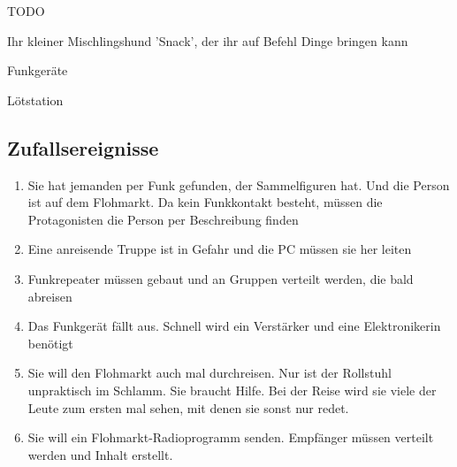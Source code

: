 \begin{npcBox}[title=Antigone]
    \begin{stunts}
    \item {}
    \end{stunts}

    \begin{stressSection}
    \end{stressSection}
    \begin{tabularx}{\textwidth}{ XX }
    \end{tabularx}

    \begin{consequences}
    \item {}
    \item {}
    \item {}
    \end{consequences}

    \begin{npcDescription}
    TODO
    \end{npcDescription}


    \begin{equipment}
    \item Ihr kleiner Mischlingshund 'Snack', der ihr auf Befehl Dinge bringen kann
    \item Funkgeräte
    \item Lötstation
    \end{equipment}
\end{npcBox}

\subsection{Zufallsereignisse}

\begin{enumerate}
\item Sie hat jemanden per Funk gefunden, der Sammelfiguren hat. Und die Person ist auf dem Flohmarkt. Da kein Funkkontakt besteht, müssen die Protagonisten die Person per Beschreibung finden
\item Eine anreisende Truppe ist in Gefahr und die PC müssen sie her leiten
\item Funkrepeater müssen gebaut und an Gruppen verteilt werden, die bald abreisen
\item Das Funkgerät fällt aus. Schnell wird ein Verstärker und eine Elektronikerin benötigt
\item Sie will den Flohmarkt auch mal durchreisen. Nur ist der Rollstuhl unpraktisch im Schlamm. Sie braucht Hilfe. Bei der Reise wird sie viele der Leute zum ersten mal sehen, mit denen sie sonst nur redet.
\item Sie will ein Flohmarkt-Radioprogramm senden. Empfänger müssen verteilt werden und Inhalt erstellt.
\end{enumerate}

